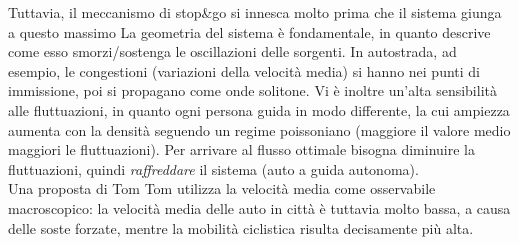 \documentclass[12pt, a4paper]{book}
\theoremstyle{theorem}
\begin{document}
			Tuttavia, il meccanismo di stop\&go si innesca molto prima che il sistema giunga a questo massimo
			La geometria del sistema è fondamentale, in quanto descrive come esso smorzi/sostenga le oscillazioni delle sorgenti.
			In autostrada, ad esempio, le congestioni (variazioni della velocità media) si hanno nei punti di immissione, poi si propagano come onde solitone.
			Vi è inoltre un'alta sensibilità alle fluttuazioni, in quanto ogni persona guida in modo differente, la cui ampiezza aumenta con la densità seguendo un regime poissoniano (maggiore il valore medio maggiori le fluttuazioni).
			Per arrivare al flusso ottimale bisogna diminuire la fluttuazioni, quindi \emph{raffreddare} il sistema (auto a guida autonoma).\\
			Una proposta di Tom Tom utilizza la velocità media come osservabile macroscopico: la velocità media delle auto in città è tuttavia molto bassa, a causa delle soste forzate, mentre la mobilità ciclistica risulta decisamente più alta.
\end{document}
